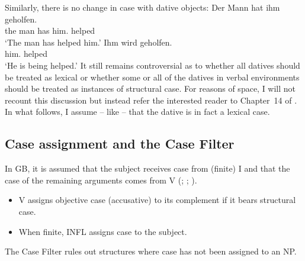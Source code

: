 Similarly, there is no change in case with dative objects:
\eal
\ex 
\gll Der Mann hat ihm geholfen.\\
     the man  has him.\dat{} helped\\
\glt `The man has helped him.'
\ex 
\gll Ihm        wird   geholfen.\\
     him.\dat{} \AUX{} helped\\
\glt `He is being helped.'
\zl
\addlines[-1]
It still remains controversial as to whether all datives should be treated as lexical or whether some or all of the datives in verbal environments should be treated as instances of structural case.
For reasons of space, I will not recount this discussion but instead refer the interested reader to Chapter~14 of .
In what follows, I assume -- like \citet[]{Haider86} -- that the dative is in fact a lexical case.



\subsection{Case assignment and the Case Filter}
\label{sec-case-assignment}

In GB, it is assumed that the subject receives case from (finite) I and
that the case of the remaining arguments comes from
V (\citealp[]{Chomsky81a}; \citealp[]{Haider84b}; \citealp[--73]{FF87a}).
\begin{principle-break}\label{Kasusprinzip-GB}
\begin{itemize}
\item V assigns objective case (accusative) to its complement if it bears structural case.
\item When finite, INFL assigns case to the subject.
\end{itemize}
\end{principle-break}
The Case Filter rules out structures where case has not been assigned to an NP.

